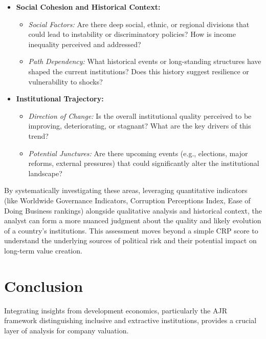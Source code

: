 \begin{itemize}
\begin{itemize}
              \item \textit{Infrastructure:} Is the physical infrastructure (transport, energy, communication) reliable and adequate to support economic activity?
          \end{itemize}
    \item \textbf{Social Cohesion and Historical Context:}
          \begin{itemize}
              \item \textit{Social Factors:} Are there deep social, ethnic, or regional divisions that could lead to instability or discriminatory policies? How is income inequality perceived and addressed?
              \item \textit{Path Dependency:} What historical events or long-standing structures have shaped the current institutions? Does this history suggest resilience or vulnerability to shocks?
          \end{itemize}
    \item \textbf{Institutional Trajectory:}
          \begin{itemize}
              \item \textit{Direction of Change:} Is the overall institutional quality perceived to be improving, deteriorating, or stagnant? What are the key drivers of this trend?
              \item \textit{Potential Junctures:} Are there upcoming events (e.g., elections, major reforms, external pressures) that could significantly alter the institutional landscape?
          \end{itemize}
\end{itemize}
By systematically investigating these areas, leveraging quantitative indicators (like Worldwide Governance Indicators, Corruption Perceptions Index, Ease of Doing Business rankings) alongside qualitative analysis and historical context, the analyst can form a more nuanced judgment about the quality and likely evolution of a country's institutions. This assessment moves beyond a simple CRP score to understand the underlying sources of political risk and their potential impact on long-term value creation.

\section{Conclusion}
Integrating insights from development economics, particularly the AJR framework distinguishing inclusive and extractive institutions, provides a crucial layer of analysis for company valuation.


